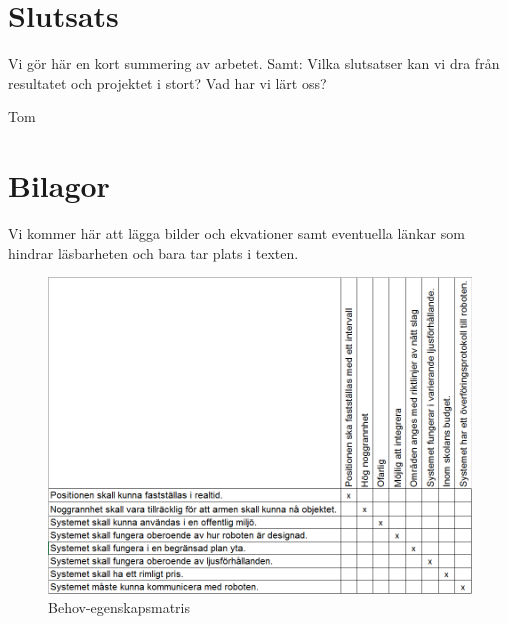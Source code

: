 \documentclass[11pt, a4paper]{report}
\begin{document}
\chapter{Slutsats}
Vi gör här en kort summering av arbetet.
Samt:
Vilka slutsatser kan vi dra från resultatet och projektet i stort?
Vad har vi lärt oss?






\newpage
\begin{thebibliography}{99}

 Tom

\end{thebibliography}

\chapter{Bilagor}
Vi kommer här att lägga bilder och ekvationer samt eventuella länkar som hindrar läsbarheten och bara tar plats i texten.

\begin{figure}[H]
	\begin{center}
		\includegraphics [width=12cm,angle=0]{behov-egenskap-matris.png}
		\caption{Behov-egenskapsmatris}
		\label{fig:behov-egenskap}
	\end{center}
\end{figure}
\end{document}
